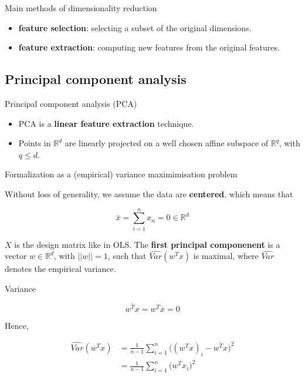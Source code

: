 \documentclass[usenames,dvipsnames]{beamer}
\begin{document}
\begin{frame}{Main methods of dimensionality reduction}
    \begin{itemize}
        \item \textbf{{feature selection}}: selecting a subset of the original dimensions.
	\item \textbf{{feature extraction}}: computing new features from the original features.
    \end{itemize}
\end{frame}

\subsection{Principal component analysis}%
\label{ssub:principal_component_analysis}

\begin{frame}{Principal component analysis (PCA)}
    \begin{itemize}
        \item PCA is a \textbf{{linear feature extraction}} technique.
	\item Points in $ \mathbb{R}^d$ are linearly projected on a well chosen affine subspace of $ \mathbb{R}^q$, with $q\leq d$.
    \end{itemize}
\end{frame}

\begin{frame}{Formalization as a (empirical) variance maximimisation problem}

Without loss of generality, we assume the data are \textbf{{centered}}, which means that

\begin{equation}
\bar{x} = \sum^{n}_{i=1} x_n=0\in \mathbb{R}^d
\end{equation}

$X$ is the design matrix like in OLS. The \textbf{{first principal componenent}} is a vector $w\in \mathbb{R}^d$, with $||w||=1$, such that $ \hat{Var}(w^Tx)$ is maximal, where $ \hat{Var}$ denotes the empirical variance.
\end{frame}


\begin{frame}{Variance}
    
    \begin{equation}
            \label{eq:}
            \overline{w^Tx} = w^T \overline{x} = 0
    \end{equation}

    Hence,

    \begin{equation}
        \begin{aligned}
            \label{eq:}
	    \hat{Var}(w^Tx) &= \frac{1}{n-1}  \sum^{n}_{i=1} \big((w^Tx)_i- \overline{w^Tx}  \big)^2\\
	    &= \frac{1}{n-1}  \sum^{n}_{i=1} \big(w^Tx_i \big)^2\\
        \end{aligned}
    \end{equation}
\end{frame}
\end{document}
